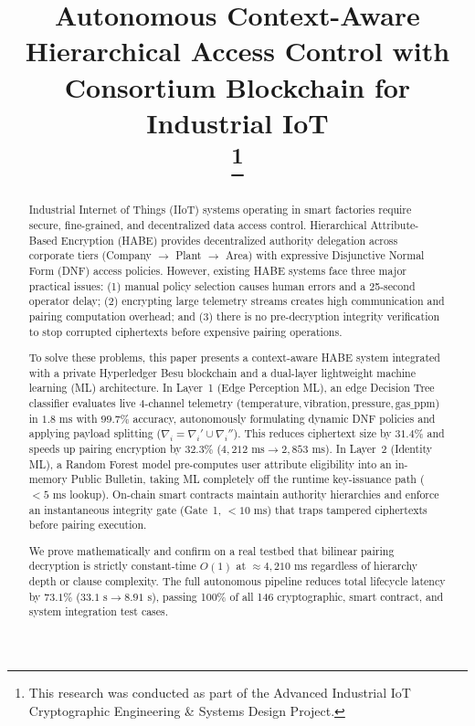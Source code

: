 \documentclass[conference]{IEEEtran}
\begin{document}
\title{Autonomous Context-Aware Hierarchical Access Control with Consortium Blockchain for Industrial IoT\\
\thanks{This research was conducted as part of the Advanced Industrial IoT Cryptographic Engineering \& Systems Design Project.}
}

\author{
}

\maketitle

\begin{abstract}
Industrial Internet of Things (IIoT) systems operating in smart factories require secure, fine-grained, and decentralized data access control. Hierarchical Attribute-Based Encryption (HABE) provides decentralized authority delegation across corporate tiers (Company $\to$ Plant $\to$ Area) with expressive Disjunctive Normal Form (DNF) access policies. However, existing HABE systems face three major practical issues: (1) manual policy selection causes human errors and a 25-second operator delay; (2) encrypting large telemetry streams creates high communication and pairing computation overhead; and (3) there is no pre-decryption integrity verification to stop corrupted ciphertexts before expensive pairing operations.

To solve these problems, this paper presents a context-aware HABE system integrated with a private Hyperledger Besu blockchain and a dual-layer lightweight machine learning (ML) architecture. In Layer~1 (Edge Perception ML), an edge Decision Tree classifier evaluates live 4-channel telemetry ($\text{temperature}, \text{vibration}, \text{pressure}, \text{gas\_ppm}$) in $1.8\text{ ms}$ with $99.7\%$ accuracy, autonomously formulating dynamic DNF policies and applying payload splitting ($\nabla_i = \nabla_i' \cup \nabla_i''$). This reduces ciphertext size by $31.4\%$ and speeds up pairing encryption by $32.3\%$ ($4,212\text{ ms} \to 2,853\text{ ms}$). In Layer~2 (Identity ML), a Random Forest model pre-computes user attribute eligibility into an in-memory Public Bulletin, taking ML completely off the runtime key-issuance path ($<5\text{ ms}$ lookup). On-chain smart contracts maintain authority hierarchies and enforce an instantaneous integrity gate (Gate~1, $<10\text{ ms}$) that traps tampered ciphertexts before pairing execution. 

We prove mathematically and confirm on a real testbed that bilinear pairing decryption is strictly constant-time $O(1)$ at $\approx 4,210\text{ ms}$ regardless of hierarchy depth or clause complexity. The full autonomous pipeline reduces total lifecycle latency by $73.1\%$ ($33.1\text{ s} \to 8.91\text{ s}$), passing 100\% of all 146 cryptographic, smart contract, and system integration test cases.
\end{abstract}
\end{document}
